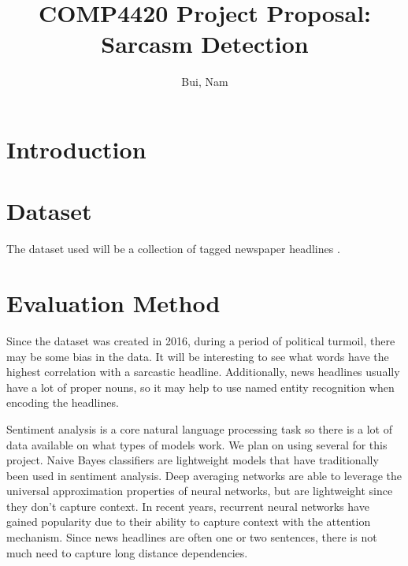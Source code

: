 \documentclass[11pt]{article}
\title{COMP4420 Project Proposal: Sarcasm Detection}
\author{
    Bui, Nam \\
    \email{nam\_bui@student.uml.edu}
}
\begin{document}
\maketitle

\section{Introduction}



\section{Dataset}

The dataset used will be a collection of
tagged newspaper headlines \cite{misra2023Sarcasm}.



\section{Evaluation Method}

Since the dataset was created in 2016,
during a period of political turmoil,
there may be some bias in the data.
It will be interesting to see what words
have the highest correlation with a sarcastic headline.
Additionally, news headlines usually have a lot of proper nouns,
so it may help to use named entity recognition when encoding the headlines.

Sentiment analysis is a core natural language processing task
so there is a lot of data available on what types of models work.
We plan on using several for this project.
Naive Bayes classifiers are lightweight models that have
traditionally been used in sentiment analysis.
Deep averaging networks are able to leverage the universal approximation properties
of neural networks, but are lightweight since they don't capture context.
In recent years, recurrent neural networks have gained popularity
due to their ability to capture context with the attention mechanism.
Since news headlines are often one or two sentences,
there is not much need to capture long distance dependencies.
\end{document}
